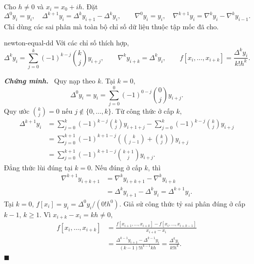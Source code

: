 \documentclass[12pt,a4paper,oneside]{book}
\numberwithin{algorithm}{chapter}
\theoremstyle{definition}
\newenvironment{chungminh}{\par\medskip\noindent\textbf{\textit{\color{mainblue}Chứng minh.}}\ }{\hfill$\blacksquare$\par\medskip}
\begin{document}
Cho $h\ne0$ và $x_i=x_0+ih$. Đặt
\[
 \Delta^0y_i=y_i,\quad\Delta^{k+1}y_i=\Delta^ky_{i+1}-\Delta^ky_i,
 \qquad
 \nabla^0y_i=y_i,\quad\nabla^{k+1}y_i=\nabla^ky_i-\nabla^ky_{i-1}.
\]
Chỉ dùng các sai phân mà toàn bộ chỉ số dữ liệu thuộc tập mốc đã cho.
\begin{menhde}{}{newton-equal-dd}
Với các chỉ số thích hợp,
\begin{equation}\label{eq:newton-equal-dd}
 \Delta^ky_i=\sum_{j=0}^{k}(-1)^{k-j}\binom kj y_{i+j},\qquad
 \nabla^ky_{i+k}=\Delta^ky_i,
 \qquad
 f[x_i,\ldots,x_{i+k}]=\frac{\Delta^ky_i}{k!h^k}.
\end{equation}
\end{menhde}
\begin{chungminh}
Quy nạp theo $k$. Tại $k=0$,
\[
 \Delta^0y_i=y_i=\sum_{j=0}^{0}(-1)^{0-j}\binom0j y_{i+j}.
\]
Quy ước $\binom kj=0$ nếu $j\notin\{0,\ldots,k\}$. Từ công thức ở cấp $k$,
\begin{align*}
 \Delta^{k+1}y_i
 &=\sum_{j=0}^{k}(-1)^{k-j}\binom kj y_{i+1+j}
   -\sum_{j=0}^{k}(-1)^{k-j}\binom kj y_{i+j}\\
 &=\sum_{j=0}^{k+1}(-1)^{k+1-j}
   \left(\binom k{j-1}+\binom kj\right)y_{i+j}\\
 &=\sum_{j=0}^{k+1}(-1)^{k+1-j}\binom{k+1}j y_{i+j}.
\end{align*}
Đẳng thức lùi đúng tại $k=0$. Nếu đúng ở cấp $k$, thì
\begin{align*}
 \nabla^{k+1}y_{i+k+1}
 &=\nabla^ky_{i+k+1}-\nabla^ky_{i+k}\\
 &=\Delta^ky_{i+1}-\Delta^ky_i=\Delta^{k+1}y_i.
\end{align*}
Tại $k=0$, $f[x_i]=y_i=\Delta^0y_i/(0!h^0)$. Giả sử công thức tỷ sai phân đúng ở cấp $k-1$, $k\geq1$. Vì $x_{i+k}-x_i=kh\ne0$,
\begin{align*}
 f[x_i,\ldots,x_{i+k}]
 &=\frac{f[x_{i+1},\ldots,x_{i+k}]-f[x_i,\ldots,x_{i+k-1}]}{x_{i+k}-x_i}\\
 &=\frac{\Delta^{k-1}y_{i+1}-\Delta^{k-1}y_i}{(k-1)!h^{k-1}kh}
 =\frac{\Delta^ky_i}{k!h^k}.
\end{align*}
\end{chungminh}
\end{document}
